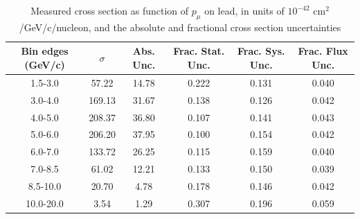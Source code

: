 \documentclass[../main.tex]{subfiles}
\begin{document}
\begin{table}
  \centering
  \renewcommand{\arraystretch}{1.15}
  \caption{Measured cross section as function of $p_{\mu}$ on lead, in units of $10^{-42}$ $\text{cm}^2$/GeV/c/nucleon, and the absolute and fractional cross section uncertainties}
    \begin{tabular}{c||c|c||c|c|c}
      Bin edges (GeV/c) &  $\sigma$  &  Abs. Unc.  &  Frac. Stat. Unc.  &  Frac. Sys. Unc.  &  Frac. Flux Unc. \\
      \hline
      \hline
      1.5-3.0 & 57.22 & 14.78 & 0.222 & 0.131 & 0.040\\
      3.0-4.0 & 169.13 & 31.67 & 0.138 & 0.126 & 0.042\\
      4.0-5.0 & 208.37 & 36.80 & 0.107 & 0.141 & 0.043\\
      5.0-6.0 & 206.20 & 37.95 & 0.100 & 0.154 & 0.042\\
      6.0-7.0 & 133.72 & 26.25 & 0.115 & 0.159 & 0.040\\
      7.0-8.5 & 61.02 & 12.21 & 0.133 & 0.150 & 0.039\\
      8.5-10.0 & 20.70 & 4.78 & 0.178 & 0.146 & 0.042\\
      10.0-20.0 & 3.54 & 1.29 & 0.307 & 0.196 & 0.059
    \end{tabular}
  \label{tbl:datanucleonnuc82muon_pa}
\end{table}
\begin{table}
  \centering
  \renewcommand{\arraystretch}{1.15}
  \caption{Statistical covariance matrix of measured cross section as function of $p_{\mu}$ on lead, in units of $10^{-84}$ $(\text{cm}^2$/GeV/c/nucleon$)^2$}
  \label{tbl:statnucleonnuc82muon_pb}
\end{table}
\end{document}
